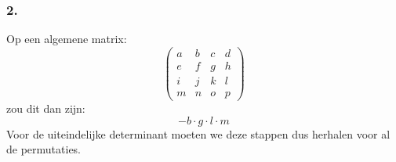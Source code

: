 \documentclass[lineaire_algebra_oplossingen.tex]{subfiles}
\begin{document}
\subsubsection*{2.}
Op een algemene matrix:
$$
\begin{pmatrix}
a & b & c & d\\
e & f & g & h\\
i & j & k & l\\
m & n & o & p
\end{pmatrix}
$$
zou dit dan zijn:
$$-b\cdot g\cdot l\cdot m$$
Voor de uiteindelijke determinant moeten we deze stappen dus herhalen voor al de permutaties.
\end{document}
